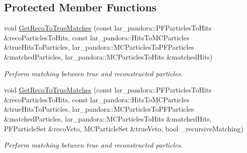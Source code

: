 \subsection*{\-Protected \-Member \-Functions}
\begin{DoxyCompactItemize}
\item 
void \hyperlink{classubxsec_1_1McPfpMatch_adb5138d94990f679643372e0be273940}{\-Get\-Reco\-To\-True\-Matches} (const lar\-\_\-pandora\-::\-P\-F\-Particles\-To\-Hits \&reco\-Particles\-To\-Hits, const lar\-\_\-pandora\-::\-Hits\-To\-M\-C\-Particles \&true\-Hits\-To\-Particles, lar\-\_\-pandora\-::\-M\-C\-Particles\-To\-P\-F\-Particles \&matched\-Particles, lar\-\_\-pandora\-::\-M\-C\-Particles\-To\-Hits \&matched\-Hits)
\begin{DoxyCompactList}\small\item\em \-Perform matching between true and reconstructed particles. \end{DoxyCompactList}\item 
void \hyperlink{classubxsec_1_1McPfpMatch_a0d41e3e0c60f2777cc26ca8b8520e9d2}{\-Get\-Reco\-To\-True\-Matches} (const lar\-\_\-pandora\-::\-P\-F\-Particles\-To\-Hits \&reco\-Particles\-To\-Hits, const lar\-\_\-pandora\-::\-Hits\-To\-M\-C\-Particles \&true\-Hits\-To\-Particles, lar\-\_\-pandora\-::\-M\-C\-Particles\-To\-P\-F\-Particles \&matched\-Particles, lar\-\_\-pandora\-::\-M\-C\-Particles\-To\-Hits \&matched\-Hits, \-P\-F\-Particle\-Set \&reco\-Veto, \-M\-C\-Particle\-Set \&true\-Veto, bool \-\_\-recursive\-Matching)
\begin{DoxyCompactList}\small\item\em \-Perform matching between true and reconstructed particles. \end{DoxyCompactList}\end{DoxyCompactItemize}
